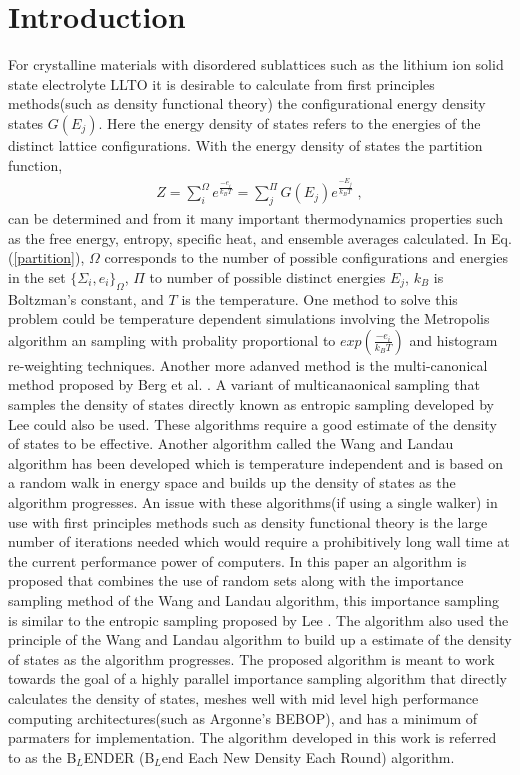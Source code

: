 \documentclass[aps,pre,reprint,superscriptaddress,showkeys]{revtex4-1}
\begin{document}
\section{Introduction}
For crystalline  materials  with disordered sublattices such as the lithium ion solid state electrolyte LLTO it is desirable to calculate from first principles methods(such as density functional theory\cite{kohn:1965}) the configurational  energy density states $G(E_j)$. Here the energy density of states refers to the energies of the distinct lattice configurations. With the energy density of states the partition function,
\begin{equation}
\begin{split}
Z = \sum_{i}^{\Omega}e^{\frac{-e_i}{k_B T} }= \sum_{j}^{\Pi}G(E_j)e^{\frac{-E_j}{k_BT}} \;,
\end{split}
\label{partition}
\end{equation}
can be  determined and from it many important thermodynamics properties such as the free energy, entropy, specific heat, and ensemble averages calculated. In Eq. (\ref{partition}), $\Omega$ corresponds to the number of possible configurations and energies in the set $\{\Sigma_i,e_i\}_\Omega$, $\Pi$ to number of possible distinct energies $E_j$, $k_B$ is Boltzman's constant, and $T$ is 
the temperature. One method to solve this problem could be temperature dependent simulations involving the  Metropolis algorithm an sampling with probality proportional  to $exp(\frac{-e_i}{k_B T})$ 
and histogram re-weighting techniques\cite{metropolis_equation_1953, landau_MC_simulations}. Another more adanved method is the multi-canonical method proposed by Berg et al. \cite{Multi_Canonical}. A variant of multicanaonical sampling that samples the density of states directly known as entropic sampling developed by Lee \cite{Entropic_Sampling} could also be used. 
These algorithms require a good estimate of the density of states to be effective.  Another algorithm called the  Wang and Landau algorithm \cite{WL_phys_rev_lett} has been developed which is temperature independent and is based on a random walk in energy space and builds up the density of states as the algorithm progresses.  An issue with these algorithms(if using a single walker) in use with first principles methods such as density functional theory is the large number of iterations needed which would require a prohibitively long wall time at the current performance power of computers.  In this paper an algorithm is proposed that combines the use of random sets along with the importance sampling method of the Wang and Landau algorithm, this importance sampling is similar to the entropic sampling proposed by Lee \cite{Entropic_Sampling}. The algorithm also used the principle of the Wang and Landau algorithm to build up a estimate of the density of states as the algorithm progresses.  The proposed algorithm is meant to work towards the goal of a highly parallel importance sampling algorithm that directly calculates the density of states, meshes well with mid level high performance computing architectures(such as Argonne's BEBOP), and has a minimum of parmaters for implementation. The algorithm developed in this work is referred to as the B$_{L}$ENDER (B$_{L}$end Each New Density Each Round) algorithm. 
\end{document}
